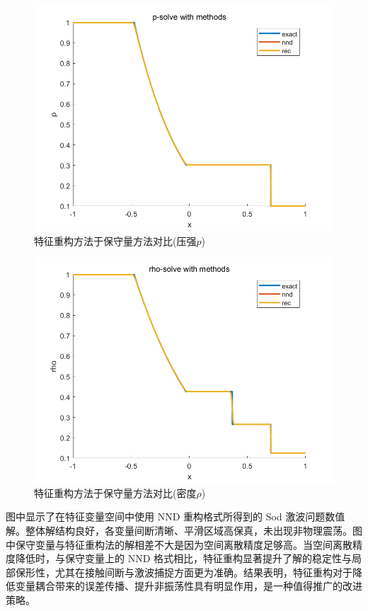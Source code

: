 \documentclass[12pt,a4paper]{article}%
\begin{document}
		\begin{figure}[H]
			\centering
			\begin{minipage}{1\textwidth}
				\centering
				\includegraphics[width=\textwidth]{./fig/p-3.png}
				\caption{\fontsize{10pt}{15pt}\selectfont 特征重构方法于保守量方法对比(压强$p$)}
			\end{minipage}
		\end{figure}
		\begin{figure}[H]
			\centering
			\begin{minipage}{1\textwidth}
				\centering
				\includegraphics[width=\textwidth]{./fig/rho-3.png}
				\caption{\fontsize{10pt}{15pt}\selectfont 特征重构方法于保守量方法对比(密度$\rho$)}
			\end{minipage}
		\end{figure}
		图中显示了在特征变量空间中使用 NND 重构格式所得到的 Sod 激波问题数值解。整体解结构良好，各变量间断清晰、平滑区域高保真，未出现非物理震荡。图中保守变量与特征重构法的解相差不大是因为空间离散精度足够高。当空间离散精度降低时，与保守变量上的 NND 格式相比，特征重构显著提升了解的稳定性与局部保形性，尤其在接触间断与激波捕捉方面更为准确。结果表明，特征重构对于降低变量耦合带来的误差传播、提升非振荡性具有明显作用，是一种值得推广的改进策略。
		
\end{document}
